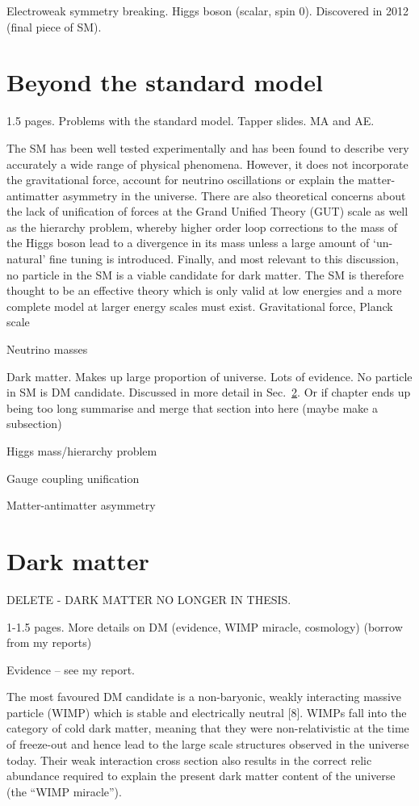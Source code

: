 Electroweak symmetry breaking. Higgs boson (scalar, spin 0). Discovered in 2012 
(final piece of SM).

\section{Beyond the standard model}
\label{sec:theory-bsm}
1.5 pages. Problems with the standard model. Tapper slides. 
MA and AE.

The SM has been well tested experimentally and has been found to describe very 
accurately a wide range of physical phenomena. However, it does not incorporate 
the gravitational force, account for neutrino oscillations or explain the 
matter-antimatter asymmetry in the universe. There are also theoretical 
concerns about the lack of unification of forces at the Grand Unified Theory
(GUT) scale as well as the hierarchy problem, whereby higher order loop 
corrections to the mass of the Higgs boson lead to a divergence in its mass 
unless a large amount of `un-natural' fine tuning is introduced. Finally, and 
most relevant to this discussion, no particle in the SM is a viable candidate 
for dark matter. The SM is therefore thought to be an effective theory which is 
only valid at low energies and a more complete model at larger energy scales 
must exist.
Gravitational force, Planck scale

Neutrino masses

Dark matter. Makes up large proportion of universe. Lots of evidence. No 
particle in SM is DM candidate. Discussed in more detail in 
Sec.~\ref{sec:theory-dm}. Or if chapter ends up being too long summarise and 
merge that section into here (maybe make a subsection)

Higgs mass/hierarchy problem

Gauge coupling unification

Matter-antimatter asymmetry

\section{Dark matter}
\label{sec:theory-dm}
DELETE - DARK MATTER NO LONGER IN THESIS.

1-1.5 pages. More details on DM (evidence, WIMP miracle, cosmology) (borrow 
from my reports)

Evidence -- see my report.

The most favoured DM candidate is a non-baryonic, weakly interacting massive 
particle (WIMP) which is stable and electrically neutral [8]. WIMPs fall into 
the category of cold dark matter, meaning that they were non-relativistic at 
the time of freeze-out and hence lead to the large scale structures observed in 
the universe today. Their weak interaction cross section also results in the 
correct relic abundance required to explain the present dark matter content of 
the universe (the ``WIMP miracle'').

